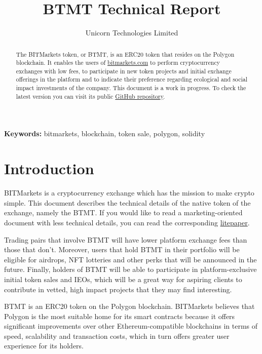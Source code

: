 \documentclass[a4paper,12pt]{article}
\title{BTMT Technical Report}
\author{Unicorn Technologies Limited}
\providecommand{\keywords}[1]{\textbf{Keywords: } #1}
\begin{document}
\maketitle

\begin{abstract}

The BITMarkets token, or BTMT, is an ERC20 token that resides on the Polygon blockchain. It enables the users of \href{https://bitmarkets.com}{bitmarkets.com} to perform cryptocurrency exchanges with low fees,
to participate in new token projects and initial exchange offerings in the platform and to
indicate their preference regarding ecological and social impact investments of the company.
This document is a work in progress. To check the latest version you can visit its public \href{https://github.com/UAB-BITmarkets/whitepaper}{GitHub repository}.

\end{abstract}

\keywords{bitmarkets, blockchain, token sale, polygon, solidity}

\section{Introduction}

BITMarkets is a cryptocurrency exchange which has the mission to make crypto simple.
This document describes the technical details of the native token of the exchange, namely the BTMT.
If you would like to read a marketing-oriented document with less technical details, you can read the corresponding \href{https://bitmarkets.com/en/documents/BTMT_Litepaper}{litepaper}.

Trading pairs that involve BTMT will have lower platform exchange fees than those that don't.
Moreover, users that hold BTMT in their portfolio will be eligible for airdrops, NFT lotteries and other perks that will be announced in the future.
Finally, holders of BTMT will be able to participate in platform-exclusive initial token sales and IEOs,
which will be a great way for aspiring clients to contribute in vetted, high impact projects that they may find interesting.

BTMT is an ERC20 token on the Polygon blockchain. BITMarkets believes that Polygon is the most suitable home for its smart contracts because it offers significant improvements over other Ethereum-compatible blockchains in terms of speed, scalability and transaction costs, which in turn offers greater user experience for its holders.
\end{document}

